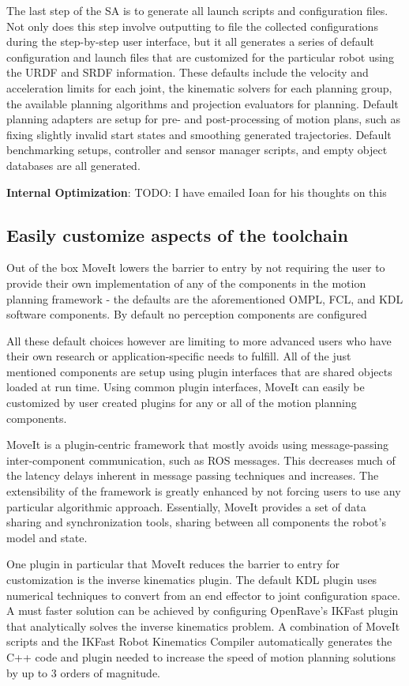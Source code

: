 \documentclass[10pt,journal,compsoc]{joser1}
\begin{document}
{The last step of the SA is to generate all launch scripts and configuration files. Not only does this step involve outputting to file the collected configurations during the step-by-step user interface, but it all generates a series of default configuration and launch files that are customized for the particular robot using the URDF and SRDF information. These defaults include the velocity and acceleration limits for each joint, the kinematic solvers for each planning group, the available planning algorithms and projection evaluators for planning. Default planning adapters are setup for pre- and post-processing of motion plans, such as fixing slightly invalid start states and smoothing generated trajectories. Default benchmarking setups, controller and sensor manager scripts, and empty object databases are all generated. 

{\bf Internal Optimization}: TODO: I have emailed Ioan for his thoughts on this

\subsection{Easily customize aspects of the toolchain}

Out of the box MoveIt lowers the barrier to entry by not requiring the user to provide their own implementation of any of the components in the motion planning framework - the defaults are the aforementioned OMPL, FCL, and KDL software components. By default no perception components are configured

All these default choices however are limiting to more advanced users who have their own research or application-specific needs to fulfill. All of the just mentioned components are setup using plugin interfaces that are shared objects loaded at run time. Using common plugin interfaces, MoveIt can easily be customized by user created plugins for any or all of the motion planning components.

MoveIt is a plugin-centric framework that mostly avoids using message-passing inter-component communication, such as ROS messages. This decreases much of the latency delays inherent in message passing techniques and increases. The extensibility of the framework is greatly enhanced by not forcing users to use any particular algorithmic approach. Essentially, MoveIt provides a set of data sharing and synchronization tools, sharing between all components the robot's model and state.

One plugin in particular that MoveIt reduces the barrier to entry for customization is the inverse kinematics plugin. The default KDL plugin uses numerical techniques to convert from an end effector to joint configuration space. A must faster solution can be achieved by configuring OpenRave's IKFast \cite{ikfast} plugin that analytically solves the inverse kinematics problem. A combination of MoveIt scripts and the IKFast Robot Kinematics Compiler automatically generates the C++ code and plugin needed to increase the speed of motion planning solutions by up to 3 orders of magnitude.

}
\end{document}
